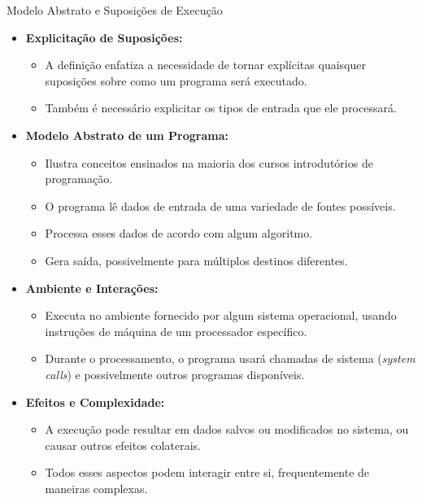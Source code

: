 \begin{frame}{Modelo Abstrato e Suposições de Execução}
    \begin{itemize}
        \item \textbf{Explicitação de Suposições:}
              \begin{itemize}
                  \item A definição enfatiza a necessidade de tornar explícitas quaisquer suposições sobre como um programa será executado.
                  \item Também é necessário explicitar os tipos de entrada que ele processará.
              \end{itemize}

        \item \textbf{Modelo Abstrato de um Programa:}
              \begin{itemize}
                  \item Ilustra conceitos ensinados na maioria dos cursos introdutórios de programação.
                  \item O programa lê dados de entrada de uma variedade de fontes possíveis.
                  \item Processa esses dados de acordo com algum algoritmo.
                  \item Gera saída, possivelmente para múltiplos destinos diferentes.
              \end{itemize}

        \item \textbf{Ambiente e Interações:}
              \begin{itemize}
                  \item Executa no ambiente fornecido por algum sistema operacional, usando instruções de máquina de um processador específico.
                  \item Durante o processamento, o programa usará chamadas de sistema (\textit{system calls}) e possivelmente outros programas disponíveis.
              \end{itemize}

        \item \textbf{Efeitos e Complexidade:}
              \begin{itemize}
                  \item A execução pode resultar em dados salvos ou modificados no sistema, ou causar outros efeitos colaterais.
                  \item Todos esses aspectos podem interagir entre si, frequentemente de maneiras complexas.
              \end{itemize}
    \end{itemize}
\end{frame}
